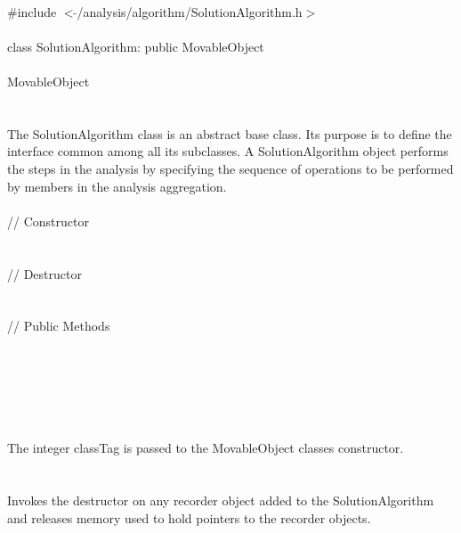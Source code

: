 
   \\
\indent \#include $<\tilde{ }$/analysis/algorithm/SolutionAlgorithm.h$>$  \\

  \\
\indent class SolutionAlgorithm: public MovableObject  \\

 \\
\indent MovableObject \\
\indent{} \\

 \\ 
\indent The SolutionAlgorithm class is an abstract base class. Its purpose
is to define the interface common among all its subclasses. A
SolutionAlgorithm object performs the steps in the analysis by specifying
the sequence of operations to be performed by members in the analysis
aggregation.\\


 \\ 
\indent // Constructor \\ 
\\  \\
\indent // Destructor \\
\\  \\
\indent // Public Methods  \\
 \\
\\	
 \\
 \\


 \\ 
\\ 
The integer \p classTag is passed to the MovableObject classes
constructor. \\

 \\
\\ 
Invokes the destructor on any recorder object added to the
SolutionAlgorithm and releases memory used to hold pointers to the
recorder objects. \\


